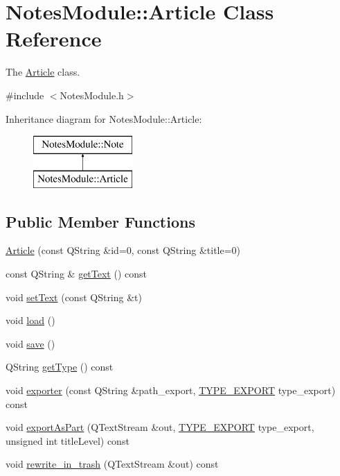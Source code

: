 \hypertarget{class_notes_module_1_1_article}{\section{Notes\-Module\-:\-:Article Class Reference}
\label{class_notes_module_1_1_article}
}


The \hyperlink{class_notes_module_1_1_article}{Article} class.  




{\ttfamily \#include $<$Notes\-Module.\-h$>$}

Inheritance diagram for Notes\-Module\-:\-:Article\-:\begin{figure}[H]
\begin{center}
\leavevmode
\includegraphics[height=2.000000cm]{class_notes_module_1_1_article}
\end{center}
\end{figure}
\subsection*{Public Member Functions}
\begin{DoxyCompactItemize}
\item 
\hyperlink{class_notes_module_1_1_article_a14bd69c93b97e3570f5f9e53e36a6611}{Article} (const Q\-String \&id=0, const Q\-String \&title=0)
\item 
const Q\-String \& \hyperlink{class_notes_module_1_1_article_a224b20a2e3bd335ea841aac87146c42f}{get\-Text} () const 
\item 
void \hyperlink{class_notes_module_1_1_article_a7144942027b1761cfcbd21761dd5cee8}{set\-Text} (const Q\-String \&t)
\item 
void \hyperlink{class_notes_module_1_1_article_ad2548df0555da4ad5e0af00c812e46c6}{load} ()
\item 
void \hyperlink{class_notes_module_1_1_article_afa8759e89a65df85ee62a5fe0af77bcc}{save} ()
\item 
Q\-String \hyperlink{class_notes_module_1_1_article_ac9d3eecc9975d1c69a46cafee33fe093}{get\-Type} () const 
\item 
void \hyperlink{class_notes_module_1_1_article_a802661b23e36dd7ab69b149a5c07b7cd}{exporter} (const Q\-String \&path\-\_\-export, \hyperlink{_t_y_p_e_s___e_x_p_o_r_t_8h_a25a17d8584d83ab977791df2476e006c}{T\-Y\-P\-E\-\_\-\-E\-X\-P\-O\-R\-T} type\-\_\-export) const 
\item 
void \hyperlink{class_notes_module_1_1_article_a62ba9a5575c03a0b8c73cca7ea343a3b}{export\-As\-Part} (Q\-Text\-Stream \&out, \hyperlink{_t_y_p_e_s___e_x_p_o_r_t_8h_a25a17d8584d83ab977791df2476e006c}{T\-Y\-P\-E\-\_\-\-E\-X\-P\-O\-R\-T} type\-\_\-export, unsigned int title\-Level) const 
\item 
void \hyperlink{class_notes_module_1_1_article_aa7c392c87fe88ef3f94aa52690bc64e2}{rewrite\-\_\-in\-\_\-trash} (Q\-Text\-Stream \&out) const 
\end{DoxyCompactItemize}
